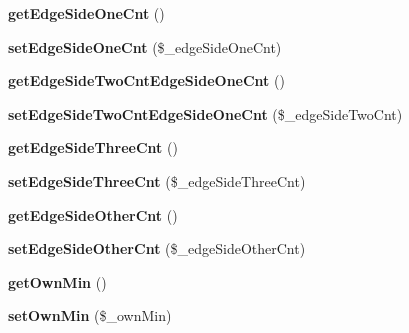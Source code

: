\begin{DoxyCompactItemize}
\item 
{\bfseries get\+Edge\+Side\+One\+Cnt} ()\hypertarget{class_reversi_anz_a1376e55e83fd05a9e29ca173425967f8}{}\label{class_reversi_anz_a1376e55e83fd05a9e29ca173425967f8}

\item 
{\bfseries set\+Edge\+Side\+One\+Cnt} (\$\+\_\+edge\+Side\+One\+Cnt)\hypertarget{class_reversi_anz_ad127ab3ba9b82be673950d183347c85e}{}\label{class_reversi_anz_ad127ab3ba9b82be673950d183347c85e}

\item 
{\bfseries get\+Edge\+Side\+Two\+Cnt\+Edge\+Side\+One\+Cnt} ()\hypertarget{class_reversi_anz_a9d096ebf2dd77ffbb69f14812e588086}{}\label{class_reversi_anz_a9d096ebf2dd77ffbb69f14812e588086}

\item 
{\bfseries set\+Edge\+Side\+Two\+Cnt\+Edge\+Side\+One\+Cnt} (\$\+\_\+edge\+Side\+Two\+Cnt)\hypertarget{class_reversi_anz_a8b87a9c1797173b0e4ebad9161eae141}{}\label{class_reversi_anz_a8b87a9c1797173b0e4ebad9161eae141}

\item 
{\bfseries get\+Edge\+Side\+Three\+Cnt} ()\hypertarget{class_reversi_anz_ae26a95d517a16d416be4126522fb532f}{}\label{class_reversi_anz_ae26a95d517a16d416be4126522fb532f}

\item 
{\bfseries set\+Edge\+Side\+Three\+Cnt} (\$\+\_\+edge\+Side\+Three\+Cnt)\hypertarget{class_reversi_anz_ac42ae43a9931dd7765f5650cf2881f3f}{}\label{class_reversi_anz_ac42ae43a9931dd7765f5650cf2881f3f}

\item 
{\bfseries get\+Edge\+Side\+Other\+Cnt} ()\hypertarget{class_reversi_anz_a7b064999c75b33d3dafd636885a30660}{}\label{class_reversi_anz_a7b064999c75b33d3dafd636885a30660}

\item 
{\bfseries set\+Edge\+Side\+Other\+Cnt} (\$\+\_\+edge\+Side\+Other\+Cnt)\hypertarget{class_reversi_anz_ad7d598abd2e505884b4e405505c81cdf}{}\label{class_reversi_anz_ad7d598abd2e505884b4e405505c81cdf}

\item 
{\bfseries get\+Own\+Min} ()\hypertarget{class_reversi_anz_a52453994039cc16cd883b615580bd678}{}\label{class_reversi_anz_a52453994039cc16cd883b615580bd678}

\item 
{\bfseries set\+Own\+Min} (\$\+\_\+own\+Min)\hypertarget{class_reversi_anz_aba52773abcdb9adc2b222977153c6a91}{}\label{class_reversi_anz_aba52773abcdb9adc2b222977153c6a91}


\end{DoxyCompactItemize}
